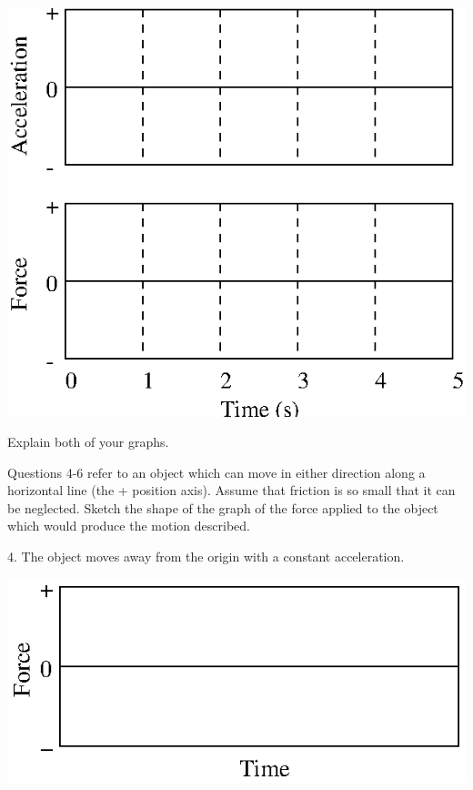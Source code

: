 \vspace{0.3cm}
{\par\centering \includegraphics{force1_fig9.eps} \par}
\vspace{0.3cm}

Explain both of your graphs.
\vspace{20mm}

Questions 4-6 refer to an object which can move in either direction along a
horizontal line (the + position axis). Assume that friction is so small that
it can be neglected. Sketch the shape of the graph of the force applied to the
object which would produce the motion described. 

4. The object moves away from the origin with a constant acceleration.

\vspace{0.3cm}
{\par\centering \includegraphics{force1_fig10.eps} \par}
\vspace{0.3cm}

